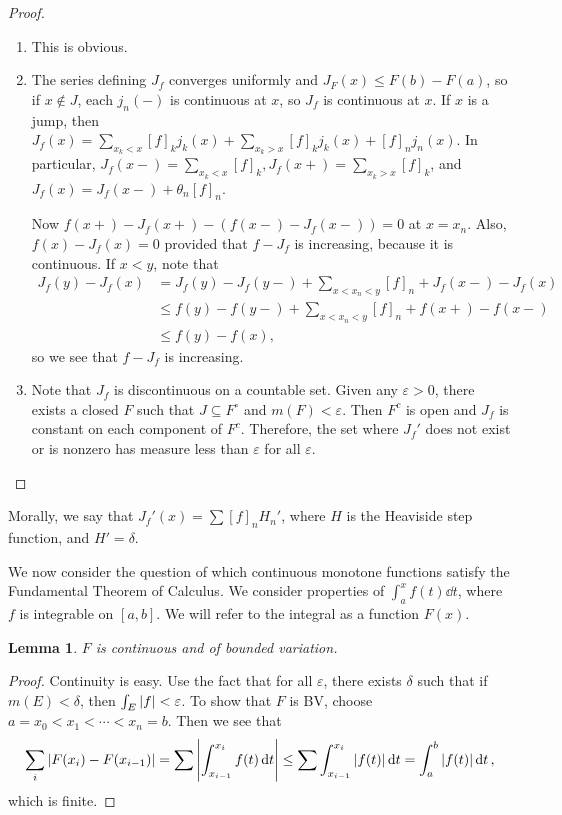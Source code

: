 \documentclass[leqno, openany]{memoir}
\newtheorem{lem}[thm]{Lemma}
\theoremstyle{definition}
\theoremstyle{remark}
\theoremstyle{plain}
\theoremstyle{definition}
\theoremstyle{remark}
\newcommand{\ep}{\varepsilon}
\begin{document}
\begin{proof}
    \begin{enumerate}
        \item This is obvious.
        \item The series defining $J_f$ converges uniformly and $J_F(x) \leq F(b) - F(a)$, so if $x \notin J$, each $j_n(-)$ is continuous at $x$, so $J_f$ is continuous at $x$. If $x$ is a jump, then $J_f(x) = \sum_{x_k < x} [f]_k j_k(x) + \sum_{x_k > x} [f]_k j_k(x) + [f]_n j_n(x)$. In particular, $J_f(x-) = \sum_{x_k < x} [f]_k, J_f(x+) = \sum_{x_k > x} [f]_k$, and $J_f(x) = J_f(x-) + \theta_n [f]_n$.

            Now $f(x+) - J_f(x+) - (f(x-) - J_f(x-)) = 0$ at $x = x_n$. Also, $f(x) - J_f(x) = 0$ provided that $f - J_f$ is increasing, because it is continuous. If $x < y$, note that
            \begin{align*}
                J_f(y) - J_f(x) &= J_f(y) - J_f(y-) + \sum_{x < x_n < y} [f]_n + J_f(x-) - J_f(x) \\
                                &\leq f(y) - f(y-) + \sum_{x < x_n < y} [f]_n + f(x+) - f(x-) \\
                                &\leq f(y) - f(x),
            \end{align*}
            so we see that $f - J_f$ is increasing.
        \item Note that $J_f$ is discontinuous on a countable set. Given any $\ep > 0$, there exists a closed $F$ such that $J \subseteq F^{\circ}$ and $m(F) < \ep$. Then $F^c$ is open and $J_f$ is constant on each component of $F^c$. Therefore, the set where $J_f'$ does not exist or is nonzero has measure less than $\ep$ for all $\ep$. \qedhere
    \end{enumerate}
\end{proof}

Morally, we say that $J_f'(x) = \sum [f]_n H_n'$, where $H$ is the Heaviside step function, and $H' = \delta$.

We now consider the question of which continuous monotone functions satisfy the Fundamental Theorem of Calculus. We consider properties of $\int_a^x f(t) \dd{t}$, where $f$ is integrable on $[a,b]$. We will refer to the integral as a function $F(x)$.

\begin{lem}
    $F$ is continuous and of bounded variation.
\end{lem}

\begin{proof}
    Continuity is easy. Use the fact that for all $\ep$, there exists $\delta$ such that if $m(E) < \delta$, then $\int_E \abs{f} < \ep$. To show that $F$ is BV, choose $a = x_0 < x_1 < \cdots < x_n = b$. Then we see that
    \[ \sum_i \abs{F(x_i) - F(x_{i-1})} = \sum \abs{\int_{x_{i-1}}^{x_i} f(t) \dd{t}} \leq \sum \int_{x_{i-1}}^{x_i} \abs{f(t)} \dd{t} = \int_a^b \abs{f(t)} \dd{t}, \]
    which is finite.
\end{proof}
\end{document}
